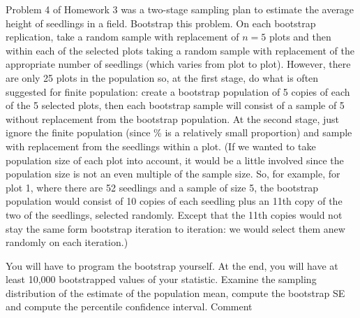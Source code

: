 \documentclass[usenames,dvipsnames]{homework}
\begin{document}

\begin{longproblem} Problem 4 of Homework 3 was a two-stage sampling plan to estimate the average height of seedlings in a field.  Bootstrap this problem.  On each bootstrap replication, take a random sample with replacement of $n=5$ plots and then within each of the selected plots taking a random sample with replacement of the appropriate number of seedlings (which varies from plot to plot).  However, there are only 25 plots in the population so, at the first stage, do what is often suggested for finite population: create a bootstrap population of 5 copies of each of the 5 selected plots, then each bootstrap sample will consist of a sample of 5 without replacement from the bootstrap population.  At the second stage, just ignore the finite population (since \unit[10]{\%} is a relatively small proportion) and sample with replacement from the seedlings within a plot.  (If we wanted to take population size of each plot into account, it would be a little involved since the population size is not an even multiple of the sample size. So, for example, for plot 1, where there are 52 seedlings and a sample of size 5, the bootstrap population would consist of 10 copies of each seedling plus an 11th copy of the two of the seedlings, selected randomly.  Except that the 11th copies would not stay the same form bootstrap iteration to iteration: we would select them anew randomly on each iteration.) 

 You will have to program the bootstrap yourself.  At the end, you will have at least 10,000 bootstrapped values of your statistic.  Examine the sampling distribution of the estimate of the population mean, compute the bootstrap SE and compute the percentile confidence interval. Comment
\end{longproblem}
\vspace{-2em}
\end{document}
